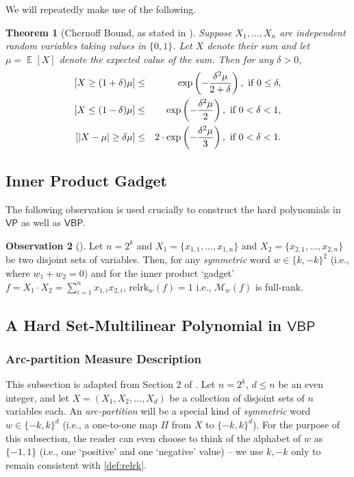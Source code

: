 \documentclass[10pt,a4paper]{article}
\newtheorem{theorem}{Theorem}[section]
\theoremstyle{definition}%
\newtheorem{obs}[theorem]{Observation}
\theoremstyle{plain}
\DeclareMathOperator*{\E}{\mathbb{E}}
\let\Pr\relax
\DeclareMathOperator*{\Pr}{\mathbb{P}}
\newcommand{\rk}{\mathrm{relrk}}
\newcommand{\VP}{\mathsf{VP}}
\newcommand{\VBP}{\mathsf{VBP}}
\newcommand{\zo}{\{0,1\}}
\newcommand{\sumi}{\sum_{i=1}^n}
\newcommand{\calM}{\mathcal{M}}
\begin{document}
We will repeatedly make use of the following.

\begin{theorem}[Chernoff Bound, as stated in \cite{mitzenmacher_upfal_2005}]\label{thm:Chernoff}
Suppose $X_1, \ldots, X_n$ are independent random variables taking values in $\zo$. Let $X$ denote their sum and let $\mu = \E[X]$ denote the expected value of the sum. Then for any $\delta > 0$,
\begin{eqnarray*} \Pr[X\ge (1+\delta)\mu] &\le& \exp\left(-\frac{\delta^2\mu}{2+\delta}\right), \text{ if }0\leq \delta, \\
  \Pr[X\le (1-\delta)\mu] &\le& \exp\left(-\frac{\delta^2\mu}{2}\right), \text{ if }0< \delta <1, \\ 
  \Pr[|X-\mu|\geq \delta \mu]&\leq& 2\cdot \exp\left(-\frac{\delta^2\mu}{3}\right),\text{ if }0< \delta <1.\\
\end{eqnarray*}
\end{theorem}

\subsection{Inner Product Gadget}
The following observation is used crucially to construct the hard polynomials in $\VP$ as well as $\VBP$. 
\begin{obs}[\cite{KushS23}]\label{obs:ip-full-rank}
    Let $n = 2^k$ and $X_1 = \{x_{1,1},\ldots,x_{1,n}\}$ and $X_2 = \{x_{2,1},\ldots,x_{2,n}\}$ be two disjoint sets of variables. Then, for any \emph{symmetric} word $w\in\{k,-k\}^2$ (i.e., where $w_1 + w_2 = 0$) and for the inner product `gadget' $ f = X_1\cdot X_2 = \sumi x_{1,i}x_{2,i}$, $\rk_w(f) = 1$ i.e., $\calM_w(f)$ is full-rank.
\end{obs}


\subsection{A Hard Set-Multilinear Polynomial in $\VBP$}\label{subsec:VBP}
\subsubsection{Arc-partition Measure Description}
This subsection is adapted from Section 2 of \cite{DvirMPY12}. Let $n = 2^k$, $d\leq n$ be an even integer, and let $X = (X_1, X_2, \ldots, X_{d})$ be a collection of disjoint sets of $n$ variables each.
An \emph{arc-partition} will be a special kind of \emph{symmetric} word $w\in \{-k,k\}^d$ (i.e., a one-to-one map $\Pi$ from $X$ to $\{-k,k\}^d$). For the purpose of this subsection, the reader can even choose to think of the alphabet of $w$ as $\{-1,1\}$ (i.e., one `positive' and one `negative' value) -- we use $k,-k$ only to remain consistent with \autoref{def:relrk}.
\end{document}
